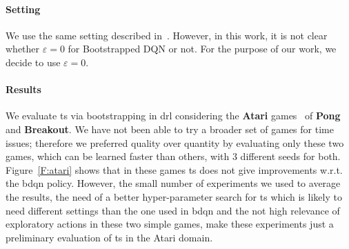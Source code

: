 \paragraph{Setting} We use the same setting described in~\cite{osband2017deep}. However, in this work, it is not clear whether $\varepsilon = 0$ for Bootstrapped DQN or not. For the purpose of our work, we decide to use $\varepsilon = 0$.
\paragraph{Results} We evaluate \gls{ts} via bootstrapping in \gls{drl} considering the \textbf{Atari} games~\cite{bellemare13arcade} of \textbf{Pong} and \textbf{Breakout}. 
We have not been able to try a broader set of games for time issues; therefore we preferred quality over quantity by evaluating only these two games, which can be learned faster than others, with $3$ different seeds for both. Figure~\ref{F:atari} shows that in these games \gls{ts} does not give improvements w.r.t. the \gls{bdqn} policy. However, the small number of experiments we used to average the results, the need of a better hyper-parameter search for \gls{ts} which is likely to need different settings than the one used in \gls{bdqn} and the not high relevance of exploratory actions in these two simple games, make these experiments just a preliminary evaluation of \gls{ts} in the Atari domain.
